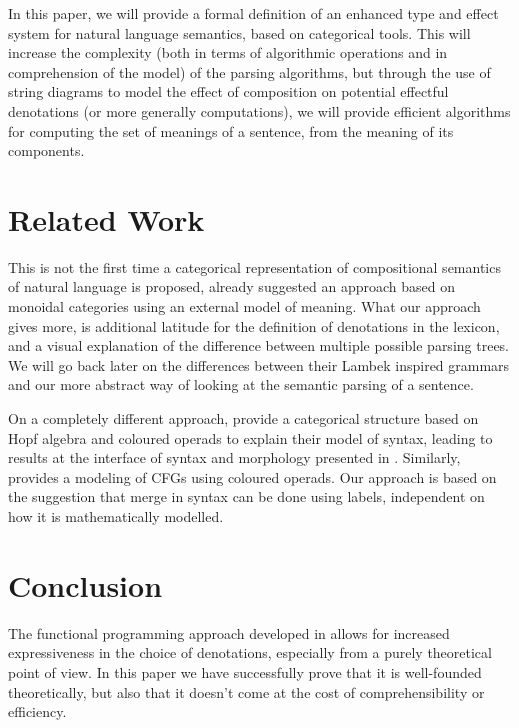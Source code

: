 \documentclass[a4paper,UKenglish,cleveref, autoref, thm-restate, anonymous]{lipics-v2021}
\begin{document}
\smallskip

In this paper, we will provide a formal definition of an enhanced type and
effect system for natural language semantics, based on categorical tools.
This will increase the complexity (both in terms of algorithmic operations and
in comprehension of the model) of the parsing algorithms, but through the use
of string diagrams to model the effect of composition on potential effectful
denotations (or more generally computations), we will provide efficient
algorithms for computing the set of meanings of a sentence, from the meaning of
its components.

\section{Related Work}
This is not the first time a categorical representation of compositional
semantics of natural language is proposed,
\cite{coeckeMathematicalFoundationsCompositional2010} already suggested an
approach based on monoidal categories using an external model of meaning.
What our approach gives more, is additional latitude for the definition of
denotations in the lexicon, and a visual explanation of the difference between
multiple possible parsing trees.
We will go back later on the differences between their Lambek inspired grammars
and our more abstract way of looking at the semantic parsing of a sentence.

\smallskip

On a completely different approach,
\cite{marcollimatildeetchomskynoametberwickrobertc.MathematicalStructureSyntactic}
provide a categorical structure based on Hopf algebra and coloured operads
to explain their model of syntax, leading to results at the interface of syntax
and morphology presented in \cite{senturiaAlgebraicStructureMorphosyntax2025}.
Similarly, \cite{melliesCategoricalContoursChomskySchutzenberger2025} provides
a modeling of CFGs using coloured operads.
Our approach is based on the suggestion that merge in syntax can be done using
labels, independent on how it is mathematically modelled.







\section{Conclusion}
The functional programming approach developed in
\cite{bumfordEffectdrivenInterpretationFunctors2025} allows for increased
expressiveness in the choice of denotations, especially from a purely
theoretical point of view.
In this paper we have successfully prove that it is well-founded theoretically,
but also that it doesn't come at the cost of comprehensibility or efficiency.
\end{document}
